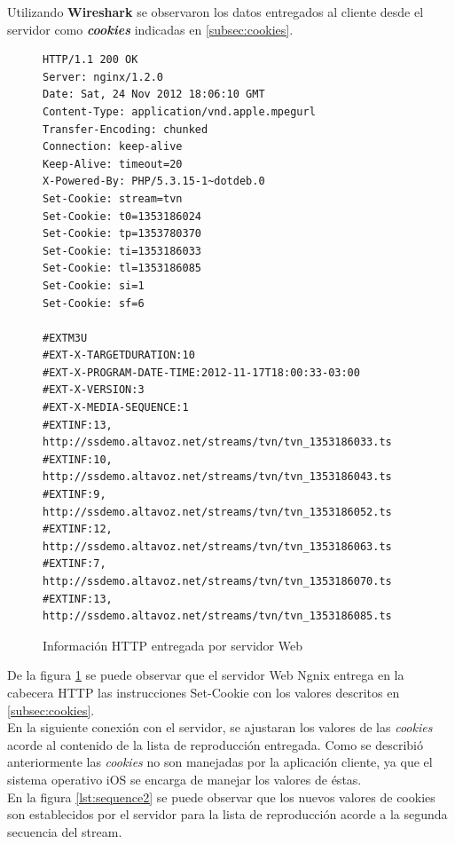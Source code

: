 Utilizando \textbf{Wireshark} se observaron los datos entregados al cliente desde el servidor como \textit{\textbf{cookies}} indicadas en \ref{subsec:cookies}.

\begin{figure}[H]
	\centering
\begin{lstlisting}
HTTP/1.1 200 OK
Server: nginx/1.2.0
Date: Sat, 24 Nov 2012 18:06:10 GMT
Content-Type: application/vnd.apple.mpegurl
Transfer-Encoding: chunked
Connection: keep-alive
Keep-Alive: timeout=20
X-Powered-By: PHP/5.3.15-1~dotdeb.0
Set-Cookie: stream=tvn
Set-Cookie: t0=1353186024
Set-Cookie: tp=1353780370
Set-Cookie: ti=1353186033
Set-Cookie: tl=1353186085
Set-Cookie: si=1
Set-Cookie: sf=6

#EXTM3U
#EXT-X-TARGETDURATION:10
#EXT-X-PROGRAM-DATE-TIME:2012-11-17T18:00:33-03:00
#EXT-X-VERSION:3
#EXT-X-MEDIA-SEQUENCE:1
#EXTINF:13,
http://ssdemo.altavoz.net/streams/tvn/tvn_1353186033.ts
#EXTINF:10,
http://ssdemo.altavoz.net/streams/tvn/tvn_1353186043.ts
#EXTINF:9,
http://ssdemo.altavoz.net/streams/tvn/tvn_1353186052.ts
#EXTINF:12,
http://ssdemo.altavoz.net/streams/tvn/tvn_1353186063.ts
#EXTINF:7,
http://ssdemo.altavoz.net/streams/tvn/tvn_1353186070.ts
#EXTINF:13,
http://ssdemo.altavoz.net/streams/tvn/tvn_1353186085.ts
\end{lstlisting}
\caption{Información HTTP entregada por servidor Web}
\label{lst:setcookies}
\end{figure}

De la figura \ref{lst:setcookies} se puede observar que el servidor Web Ngnix\cite{bib:ngnix-homepage} entrega en la cabecera HTTP las instrucciones Set-Cookie con los valores descritos en \ref{subsec:cookies}. \\

En la siguiente conexión con el servidor, se ajustaran los valores de las \textit{cookies} acorde al contenido de la lista de reproducción entregada. Como se describió anteriormente las \textit{cookies} no son manejadas por la aplicación cliente, ya que el sistema operativo iOS se encarga de manejar los valores de éstas.\\

En la figura \ref{lst:sequence2} se puede observar que los nuevos valores de cookies son establecidos por el servidor para la lista de reproducción acorde a la segunda secuencia del stream.

